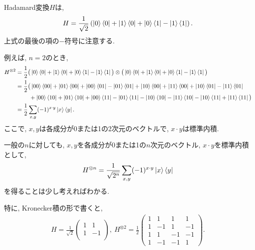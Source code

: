 \begin{ex}
    \label{ex2.33}
    Hadamard変換$H$は,
    \begin{align*}
        H =
        \frac{1}{\sqrt{2}}
        \left(
        \ket{0} \bra{0} + \ket{1} \bra{0} + \ket{0} \bra{1} - \ket{1} \bra{1}
        \right).
    \end{align*}
    上式の最後の項の$-$符号に注意する.
    \par
    例えば, $n=2$のとき,
    \begin{align*}
        H^{\otimes 2}
         & =
        \frac{1}{2}
        \big(
        \ket{0} \bra{0} + \ket{1} \bra{0} + \ket{0} \bra{1} - \ket{1} \bra{1}
        \big)
        \otimes
        \big(
        \ket{0} \bra{0} + \ket{1} \bra{0} + \ket{0} \bra{1} - \ket{1} \bra{1}
        \big)
        \\
         & =
        \frac{1}{2}
        \big(
        \ket{00} \bra{00} + \ket{01} \bra{00} + \ket{00} \bra{01} - \ket{01} \bra{01}
        +
        \ket{10} \bra{00} + \ket{11} \bra{00} + \ket{10} \bra{01} - \ket{11} \bra{01}
        \\
         & \ \ \ \ \ \ \ + \ket{00} \bra{10} + \ket{01} \bra{10} + \ket{00} \bra{11} - \ket{01} \bra{11}
        -
        \ket{10} \bra{10} - \ket{11} \bra{10} - \ket{10} \bra{11} + \ket{11} \bra{11}
        \big)                                                                                            \\
         & =
        \frac{1}{2} \sum_{x,y} (-1)^{x \cdot y}\ket{x}\bra{y} .
    \end{align*}
    ここで, $x,y$は各成分が0または1の2次元のベクトルで, $x \cdot y $は標準内積.
    \par
    一般の$n$に対しても,
    $x,y$を各成分が0または1の$n$次元のベクトル, $x \cdot y $を標準内積として,
    \begin{align*}
        H^{\otimes n}
        = \frac{1}{\sqrt{2^n}} \sum_{x,y} (-1)^{x \cdot y}\ket{x}\bra{y}
    \end{align*}
    を得ることは少し考えればわかる.
    \par
    特に, Kronecker積の形で書くと,
    \begin{align*}
        H
        =
        \frac{1}{\sqrt{2}}
        \begin{pmatrix}
            1 & 1  \\
            1 & -1 \\
        \end{pmatrix}
        ,\
        H^{\otimes 2}
        =
        \frac{1}{2}
        \begin{pmatrix}
            1 & 1  & 1  & 1  \\
            1 & -1 & 1  & -1 \\
            1 & 1  & -1 & -1 \\
            1 & -1 & -1 & 1
        \end{pmatrix}.
    \end{align*}
\end{ex}

